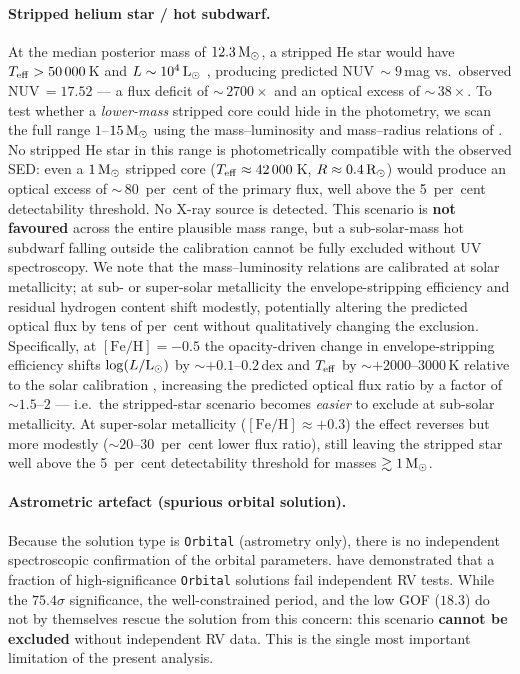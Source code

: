 \documentclass[usenatbib,fleqn]{mnras}
\newcommand{\Msun}{{\rm M}_\odot}
\newcommand{\Lsun}{{\rm L}_\odot}
\newcommand{\Rsun}{{\rm R}_\odot}
\begin{document}
\paragraph*{Stripped helium star / hot subdwarf.}
At the median posterior mass of $12.3\,\Msun$, a stripped He star
would have $T_{\rm eff} > 50\,000$\,K and
$L \sim 10^4\,\Lsun$ \citep{Gotberg2018}, producing predicted
NUV$\,\sim 9$\,mag vs.\ observed NUV$\,= 17.52$ --- a flux
deficit of $\sim$\,$2700\times$ and an optical excess of
$\sim$\,$38\times$.  To test whether a \emph{lower-mass} stripped
core could hide in the photometry, we scan the full range
$1$--$15\,\Msun$ using the mass--luminosity and mass--radius
relations of \citet{Gotberg2018}.  No stripped He star in this
range is photometrically compatible with the observed SED: even
a $1\,\Msun$ stripped core ($T_{\rm eff} \approx 42\,000$\,K,
$R \approx 0.4\,\Rsun$) would produce an optical excess of
$\sim$\,$80$~per~cent of the primary flux, well above the
5~per~cent detectability threshold.  No X-ray source is detected.
This scenario is \textbf{not favoured} across the entire
plausible mass range, but a sub-solar-mass hot subdwarf falling
outside the \citet{Gotberg2018} calibration cannot be fully
excluded without UV spectroscopy.  We note that the
\citet{Gotberg2018} mass--luminosity relations are calibrated at
solar metallicity; at sub- or super-solar metallicity the
envelope-stripping efficiency and residual hydrogen content shift
modestly, potentially altering the predicted optical flux by
tens of per~cent without qualitatively changing the exclusion.
Specifically, at $[\mathrm{Fe/H}] = -0.5$ the opacity-driven
change in envelope-stripping efficiency shifts
$\log(L/\Lsun)$ by $\sim +0.1$--$0.2$\,dex and
$T_{\rm eff}$ by $\sim +2000$--$3000\,$K relative to the solar
calibration \citep{Gotberg2018}, increasing the predicted optical
flux ratio by a factor of $\sim 1.5$--$2$ --- i.e.\ the
stripped-star scenario becomes \emph{easier} to exclude at
sub-solar metallicity.  At super-solar metallicity
($[\mathrm{Fe/H}] \approx +0.3$) the effect reverses but more
modestly ($\sim 20$--$30$~per~cent lower flux ratio), still
leaving the stripped star well above the 5~per~cent detectability
threshold for masses $\gtrsim 1\,\Msun$.

\paragraph*{Astrometric artefact (spurious orbital solution).}
Because the solution type is \texttt{Orbital} (astrometry only),
there is no independent spectroscopic confirmation of the orbital
parameters.  \citet{ElBadry2024} have demonstrated that a
fraction of high-significance \texttt{Orbital} solutions fail
independent RV tests.  While the $75.4\sigma$ significance, the
well-constrained period, and the low GOF ($18.3$) do not by
themselves rescue the solution from this concern: this scenario
\textbf{cannot be excluded}
without independent RV data.  This is the single most important
limitation of the present analysis.
\end{document}
